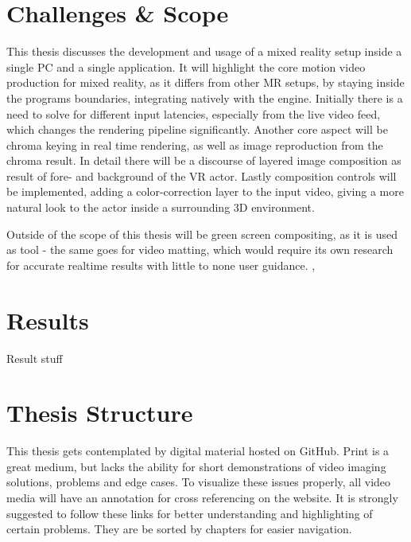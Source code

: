 \section{Challenges \& Scope}
\label{sec:intro:challenges}

This thesis discusses the development and usage of a mixed reality setup inside 
a single PC and a single application.
\newline
It will highlight the core motion video production for mixed reality, as it 
differs from other MR setups, by staying inside the programs boundaries, 
integrating natively with the engine. Initially there is a need to solve for 
different input latencies, especially from the live video feed, which changes 
the rendering pipeline significantly.
\newline
Another core aspect will be chroma keying in real time rendering, as well as 
image reproduction from the chroma result. In detail there will be a discourse 
of layered image composition as result of fore- and background of the VR actor.
\newline
Lastly composition controls will be implemented, adding a color-correction 
layer to the input video, giving a more natural look to the actor inside a 
surrounding 3D environment.

Outside of the scope of this thesis will be green screen compositing, as it is 
used as tool - the same goes for video matting, which would require its own 
research for accurate realtime results with little to none user guidance. 
\cite{gong:realtime-matting:2010}, \cite{gastal:shared-sampling:2010}

\section{Results}
\label{sec:intro:results}

Result stuff

\section{Thesis Structure}
\label{sec:intro:structure}

This thesis gets contemplated by digital material hosted on GitHub. Print is a 
great medium, but lacks the ability for short demonstrations of video imaging 
solutions, problems and edge cases. To visualize these issues properly, all 
video media will have an annotation for cross referencing on the website. It is 
strongly suggested to follow these links for better understanding and 
highlighting of certain problems. They are be sorted by chapters for easier 
navigation.